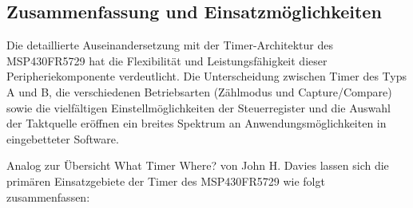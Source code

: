 \newpage
\subsection{Zusammenfassung und Einsatzm\"oglichkeiten}
\label{sec:TimerEinsatzmoeglichkeiten}

Die detaillierte Auseinandersetzung mit der Timer-Architektur des MSP430FR5729 hat die Flexibilit\"at und Leistungsf\"ahigkeit dieser Peripheriekomponente verdeutlicht. Die Unterscheidung zwischen Timer des Typs A und B, die verschiedenen Betriebsarten (Z\"ahlmodus und Capture/Compare) sowie die vielf\"altigen Einstellm\"oglichkeiten der Steuerregister und die Auswahl der Taktquelle er\"offnen ein breites Spektrum an Anwendungsm\"oglichkeiten in eingebetteter Software.

Analog zur \"Ubersicht \glqq What Timer Where?\grqq{} von John H. Davies lassen sich die prim\"aren Einsatzgebiete der Timer des MSP430FR5729 wie folgt zusammenfassen: 

